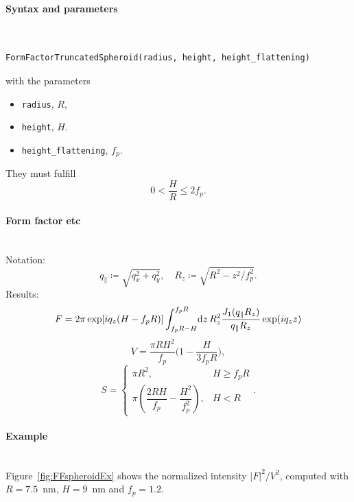 \paragraph{Syntax and parameters}\strut\\[-2ex plus .2ex minus .2ex]
\begin{lstlisting}[language=python, style=eclipseboxed,numbers=none,nolol]
  FormFactorTruncatedSpheroid(radius, height, height_flattening)
\end{lstlisting}
with the parameters
\begin{itemize}
\item \texttt{radius}, $R$,
\item \texttt{height}, $H$.
\item \texttt{height\_flattening}, $f_p$.
\end{itemize}
They must fulfill
\begin{displaymath}
  0< \dfrac{H}{R}\le 2f_p.
\end{displaymath}


\paragraph{Form factor etc}\strut\\
Notation:
\begin{equation*} 
  q_{\parallel} \coloneqq \sqrt{q_x^2+q_y^2}, \quad
  R_z \coloneqq \sqrt{R^2-z^2/f_p^2}.
\end{equation*} 
Results:
\begin{equation*} 
F =   2\pi \exp[iq_z(H-f_pR)] \int_{f_p R-H}^{f_p R} \!\text{d} z\,
     R_z^2\frac{J_1(q_{\parallel}R_z)}{q_{\parallel}R_z} \exp(i q_z z) 
\end{equation*}
\begin{equation*}
  V = \dfrac{\pi R H^2}{f_p}  \Big(1-\dfrac{H}{3f_p R}\Big),
\end{equation*}
\begin{equation*}
  S = \left\{\begin{array}{ll} \pi R^2, & H \geq f_pR \\
         \pi\left(\dfrac{2RH}{f_p}-\dfrac{H^2}{f_p^2}\right), & H < R \end{array}\right..
\end{equation*}

\paragraph{Example}\strut\\
Figure~\ref{fig:FFspheroidEx} shows the normalized intensity
$|F|^2/V^2$, computed with $R=7.5$~nm, $H=9$~nm and $f_p=1.2$.

